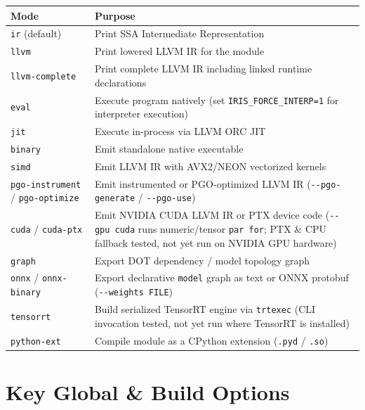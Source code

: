 \documentclass[
  english,
  oneside]{book}
\newcounter{none} %
\begin{document}
{\def\LTcaptype{none} %
\begin{longtable}[]{@{}
  >{\raggedright\arraybackslash}p{}
  >{\raggedright\arraybackslash}p{}@{}}
\toprule\noalign{}
\begin{minipage}[b]{\linewidth}\raggedright
Mode
\end{minipage} & \begin{minipage}[b]{\linewidth}\raggedright
Purpose
\end{minipage} \\
\midrule\noalign{}
\endhead
\bottomrule\noalign{}
\endlastfoot
\texttt{ir} (default) & Print SSA Intermediate Representation \\
\texttt{llvm} & Print lowered LLVM IR for the module \\
\texttt{llvm-complete} & Print complete LLVM IR including linked runtime
declarations \\
\texttt{eval} & Execute program natively (set
\texttt{IRIS\_FORCE\_INTERP=1} for interpreter execution) \\
\texttt{jit} & Execute in-process via LLVM ORC JIT \\
\texttt{binary} & Emit standalone native executable \\
\texttt{simd} & Emit LLVM IR with AVX2/NEON vectorized kernels \\
\texttt{pgo-instrument} / \texttt{pgo-optimize} & Emit instrumented or
PGO-optimized LLVM IR (\texttt{-\/-pgo-generate} /
\texttt{-\/-pgo-use}) \\
\texttt{cuda} / \texttt{cuda-ptx} & Emit NVIDIA CUDA LLVM IR or PTX
device code (\texttt{-\/-gpu\ cuda} runs numeric/tensor
\texttt{par\ for}; PTX \& CPU fallback tested, not yet run on NVIDIA GPU
hardware) \\
\texttt{graph} & Export DOT dependency / model topology graph \\
\texttt{onnx} / \texttt{onnx-binary} & Export declarative \texttt{model}
graph as text or ONNX protobuf (\texttt{-\/-weights\ FILE}) \\
\texttt{tensorrt} & Build serialized TensorRT engine via
\texttt{trtexec} (CLI invocation tested, not yet run where TensorRT is
installed) \\
\texttt{python-ext} & Compile module as a CPython extension
(\texttt{.pyd} / \texttt{.so}) \\
\end{longtable}
}

\section{Key Global \& Build Options}\label{key-global-build-options}
\end{document}
